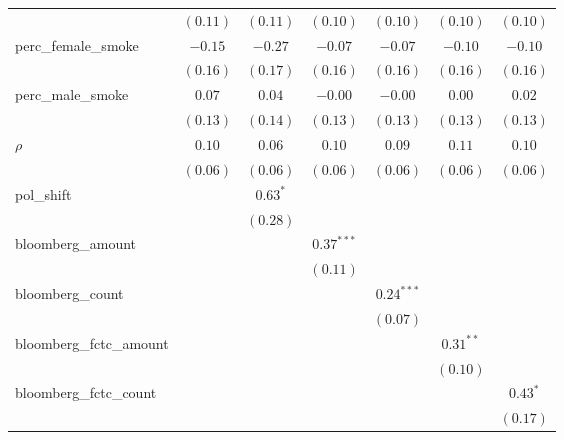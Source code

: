\begin{table}[!h]
\begin{center}
\begin{tabular}{l c c c c c c }
                        & $(0.11)$     & $(0.11)$     & $(0.10)$     & $(0.10)$     & $(0.10)$     & $(0.10)$     \\
perc\_female\_smoke     & $-0.15$      & $-0.27$      & $-0.07$      & $-0.07$      & $-0.10$      & $-0.10$      \\
                        & $(0.16)$     & $(0.17)$     & $(0.16)$     & $(0.16)$     & $(0.16)$     & $(0.16)$     \\
perc\_male\_smoke       & $0.07$       & $0.04$       & $-0.00$      & $-0.00$      & $0.00$       & $0.02$       \\
                        & $(0.13)$     & $(0.14)$     & $(0.13)$     & $(0.13)$     & $(0.13)$     & $(0.13)$     \\
$\rho$                  & $0.10$       & $0.06$       & $0.10$       & $0.09$       & $0.11$       & $0.10$       \\
                        & $(0.06)$     & $(0.06)$     & $(0.06)$     & $(0.06)$     & $(0.06)$     & $(0.06)$     \\
pol\_shift              &              & $0.63^{*}$   &              &              &              &              \\
                        &              & $(0.28)$     &              &              &              &              \\
bloomberg\_amount       &              &              & $0.37^{***}$ &              &              &              \\
                        &              &              & $(0.11)$     &              &              &              \\
bloomberg\_count        &              &              &              & $0.24^{***}$ &              &              \\
                        &              &              &              & $(0.07)$     &              &              \\
bloomberg\_fctc\_amount &              &              &              &              & $0.31^{**}$  &              \\
                        &              &              &              &              & $(0.10)$     &              \\
bloomberg\_fctc\_count  &              &              &              &              &              & $0.43^{*}$   \\
                        &              &              &              &              &              & $(0.17)$     \\

\end{tabular}
\end{center}
\end{table}
